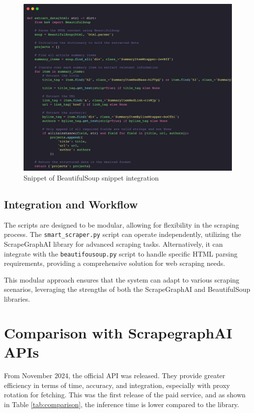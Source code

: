 \begin{figure}[H]
    \centering
    \includegraphics[width=0.95\linewidth]{Assets/beautifousoup.png}
    \caption{Snippet of BeautifulSoup snippet integration}
    \label{fig:beautifousoup}
\end{figure}

\subsection{Integration and Workflow}

The scripts are designed to be modular, allowing for flexibility in the scraping process. The \texttt{smart\_scraper.py} script can operate independently, utilizing the ScrapeGraphAI library for advanced scraping tasks. Alternatively, it can integrate with the \texttt{beautifousoup.py} script to handle specific HTML parsing requirements, providing a comprehensive solution for web scraping needs.

This modular approach ensures that the system can adapt to various scraping scenarios, leveraging the strengths of both the ScrapeGraphAI and BeautifulSoup libraries.

\section{Comparison with ScrapegraphAI APIs}
From November 2024, the official API was released. They provide greater efficiency in terms of time, accuracy, and integration, especially with proxy rotation for fetching. This was the first release of the paid service, and as shown in Table \ref{tab:comparison}, the inference time is lower compared to the library.

